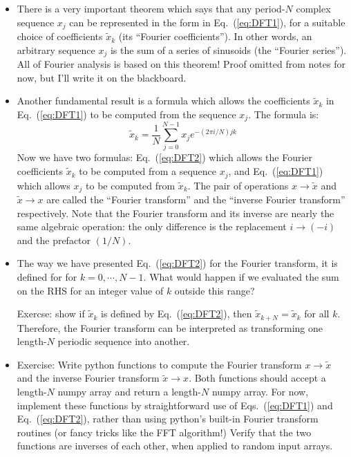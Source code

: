 \documentclass[aps,prd,superscriptaddress,groupedaddress,nofootinbib,nobibnotes]{revtex4}
\newcommand{\be}{\begin{equation}}
\newcommand{\ee}{\end{equation}}
\def\tx{{\tilde x}}
\begin{document}
\begin{itemize}
\item There is a very important theorem which says that any period-$N$ complex sequence $x_j$
 can be represented in the form in Eq.~(\ref{eq:DFT1}), for a suitable choice of coefficients $\tx_k$
 (its ``Fourier coefficients'').
 In other words, an arbitrary sequence $x_j$ is the sum of a series of sinusoids (the ``Fourier series'').
 All of Fourier analysis is based on this theorem!  Proof omitted from notes for now, but I'll
 write it on the blackboard.

\item Another fundamental result is a formula which allows the coefficients $\tx_k$ in Eq.~(\ref{eq:DFT1})
 to be computed from the sequence $x_j$.  The formula is:
\be
  \tx_k = \frac{1}{N} \sum_{j=0}^{N-1} x_j e^{-(2\pi i / N) j k}  \label{eq:DFT2}
\ee
 Now we have two formulas: Eq.~(\ref{eq:DFT2}) which allows the Fourier coefficients $\tx_k$ to be
 computed from a sequence $x_j$, and Eq.~(\ref{eq:DFT1}) which allows $x_j$ to be computed from $\tx_k$.
 The pair of operations $x \rightarrow \tx$ and $\tx \rightarrow x$ are called the ``Fourier transform''
 and the ``inverse Fourier transform'' respectively.
 Note that the Fourier transform and its inverse are nearly the same algebraic operation: 
 the only difference is the replacement $i \rightarrow (-i)$ and the prefactor $(1/N)$.

\item The way we have presented Eq.~(\ref{eq:DFT2}) for the Fourier transform, it is defined for
 for $k=0,\cdots,N-1$.  What would happen if we evaluated the sum on the RHS for an integer value 
 of $k$ outside this range?

 Exercse: show if $\tx_k$ is defined by Eq.~(\ref{eq:DFT2}), then $\tx_{k+N} = \tx_k$ for all $k$.
 Therefore, the Fourier transform can be interpreted as transforming one length-$N$ periodic sequence
 into another.

\item Exercise: Write python functions to compute the Fourier transform $x \rightarrow \tx$ and the inverse
 Fourier transform $\tx \rightarrow x$.  Both functions should accept a length-$N$ numpy array and return 
 a length-$N$ numpy array.  For now, implement these functions by straightforward use of Eqs.~(\ref{eq:DFT1})
 and Eq.~(\ref{eq:DFT2}), rather than using python's built-in Fourier transform routines (or fancy tricks
 like the FFT algorithm!)  Verify that the two functions are inverses of each other, when applied to random 
 input arrays.


\end{itemize}
\end{document}
